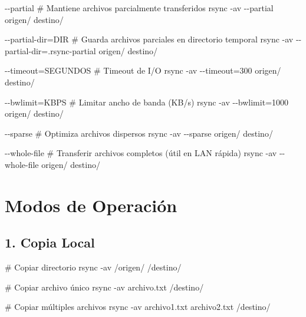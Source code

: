 \documentclass[
  doc,
  floatsintext,
  longtable,
  a4paper,
  nolmodern,
  notxfonts,
  notimes,
  12pt,
  colorlinks=true,linkcolor=blue,citecolor=blue,urlcolor=blue]{apa7}
\newenvironment{Shaded}{\begin{snugshade}}{\end{snugshade}}
\newcommand{\AttributeTok}[1]{\textcolor[rgb]{0.40,0.45,0.13}{#1}}
\newcommand{\CommentTok}[1]{\textcolor[rgb]{0.37,0.37,0.37}{#1}}
\newcommand{\ExtensionTok}[1]{\textcolor[rgb]{0.00,0.23,0.31}{#1}}
\newcommand{\FunctionTok}[1]{\textcolor[rgb]{0.28,0.35,0.67}{#1}}
\newcommand{\NormalTok}[1]{\textcolor[rgb]{0.00,0.23,0.31}{#1}}
\newcommand{\OperatorTok}[1]{\textcolor[rgb]{0.37,0.37,0.37}{#1}}
\begin{document}
\begin{Shaded}
\begin{Highlighting}[]
\ExtensionTok{{-}{-}partial}
    \CommentTok{\# Mantiene archivos parcialmente transferidos}
    \FunctionTok{rsync} \AttributeTok{{-}av} \AttributeTok{{-}{-}partial}\NormalTok{ origen/ destino/}

\ExtensionTok{{-}{-}partial{-}dir=DIR}
    \CommentTok{\# Guarda archivos parciales en directorio temporal}
    \FunctionTok{rsync} \AttributeTok{{-}av} \AttributeTok{{-}{-}partial{-}dir}\OperatorTok{=}\NormalTok{.rsync{-}partial origen/ destino/}

\ExtensionTok{{-}{-}timeout=SEGUNDOS}
    \CommentTok{\# Timeout de I/O}
    \FunctionTok{rsync} \AttributeTok{{-}av} \AttributeTok{{-}{-}timeout}\OperatorTok{=}\NormalTok{300 origen/ destino/}

\ExtensionTok{{-}{-}bwlimit=KBPS}
    \CommentTok{\# Limitar ancho de banda (KB/s)}
    \FunctionTok{rsync} \AttributeTok{{-}av} \AttributeTok{{-}{-}bwlimit}\OperatorTok{=}\NormalTok{1000 origen/ destino/}

\ExtensionTok{{-}{-}sparse}
    \CommentTok{\# Optimiza archivos dispersos}
    \FunctionTok{rsync} \AttributeTok{{-}av} \AttributeTok{{-}{-}sparse}\NormalTok{ origen/ destino/}

\ExtensionTok{{-}{-}whole{-}file}
    \CommentTok{\# Transferir archivos completos (útil en LAN rápida)}
    \FunctionTok{rsync} \AttributeTok{{-}av} \AttributeTok{{-}{-}whole{-}file}\NormalTok{ origen/ destino/}
\end{Highlighting}
\end{Shaded}

\section{Modos de Operación}\label{modos-de-operaciuxf3n}

\subsection{1. Copia Local}\label{copia-local}

\begin{Shaded}
\begin{Highlighting}[]
\CommentTok{\# Copiar directorio}
\FunctionTok{rsync} \AttributeTok{{-}av}\NormalTok{ /origen/ /destino/}

\CommentTok{\# Copiar archivo único}
\FunctionTok{rsync} \AttributeTok{{-}av}\NormalTok{ archivo.txt /destino/}

\CommentTok{\# Copiar múltiples archivos}
\FunctionTok{rsync} \AttributeTok{{-}av}\NormalTok{ archivo1.txt archivo2.txt /destino/}
\end{Highlighting}
\end{Shaded}
\end{document}
